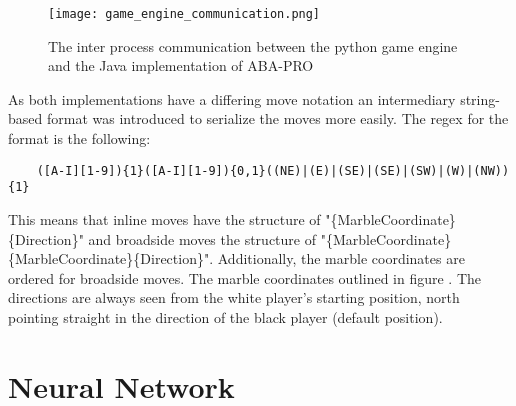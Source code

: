 \begin{figure}
    \centering
    \texttt{[image: game\_engine\_communication.png]}
    \caption{The inter process communication between the python game engine and the Java implementation of ABA-PRO}
    \label{python_java_ipc}
\end{figure}

As both implementations have a differing move notation an intermediary string-based format was introduced to serialize the moves more easily. The regex for the format is the following:

\begin{BVerbatim}
    ([A-I][1-9]){1}([A-I][1-9]){0,1}((NE)|(E)|(SE)|(SE)|(SW)|(W)|(NW)){1}
\end{BVerbatim}

This means that inline moves have the structure of "\{MarbleCoordinate\}\{Direction\}" and broadside moves the structure of "\{MarbleCoordinate\}\{MarbleCoordinate\}\{Direction\}". Additionally, the marble coordinates are ordered for broadside moves. The marble coordinates outlined in figure . The directions are always seen from the white player's starting position, north pointing straight in the direction of the black player (default position).

\section{Neural Network}
